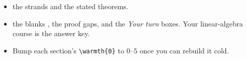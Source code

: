 \documentclass{loom}
\begin{document}
\begin{itemize}[leftmargin=1.3em,itemsep=1pt]
  \item {} the strands and the stated theorems.
  \item {} the blanks \fillin[1.2cm], the  proof gaps, and
        the \emph{Your turn} boxes. Your linear-algebra course is the answer key.
  \item Bump each section's \texttt{\textbackslash warmth\{0\}} to $0$--$5$ once you can rebuild it cold.
\end{itemize}

\bigskip
{\small\tableofcontents}

\clearpage





\end{document}
